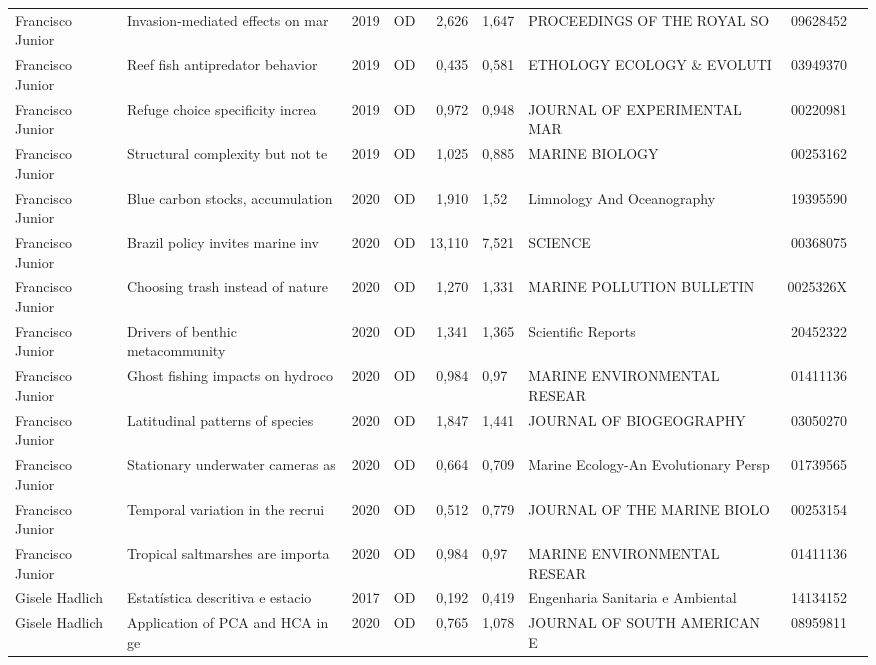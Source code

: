 \documentclass[12pt,brazil]{article}\usepackage[]{graphicx}\usepackage[]{xcolor}
\begin{document}
\begin{longtable}{lllrrllrr}
Francisco Junior & Invasion-mediated effects on mar & 2019 & OD & 2,626 & 1,647 & PROCEEDINGS OF THE ROYAL SO & 09628452 \\
Francisco Junior & Reef fish antipredator behavior  & 2019 & OD & 0,435 & 0,581 & ETHOLOGY ECOLOGY \& EVOLUTI & 03949370 \\
Francisco Junior & Refuge choice specificity increa & 2019 & OD & 0,972 & 0,948 & JOURNAL OF EXPERIMENTAL MAR & 00220981 \\
Francisco Junior & Structural complexity but not te & 2019 & OD & 1,025 & 0,885 & MARINE BIOLOGY & 00253162 \\
Francisco Junior & Blue carbon stocks, accumulation & 2020 & OD & 1,910 & 1,52 & Limnology And Oceanography & 19395590 \\
Francisco Junior & Brazil policy invites marine inv & 2020 & OD & 13,110 & 7,521 & SCIENCE & 00368075 \\
Francisco Junior & Choosing trash instead of nature & 2020 & OD & 1,270 & 1,331 & MARINE POLLUTION BULLETIN & 0025326X \\
Francisco Junior & Drivers of benthic metacommunity & 2020 & OD & 1,341 & 1,365 & Scientific Reports & 20452322 \\
Francisco Junior & Ghost fishing impacts on hydroco & 2020 & OD & 0,984 & 0,97 & MARINE ENVIRONMENTAL RESEAR & 01411136 \\
Francisco Junior & Latitudinal patterns of species  & 2020 & OD & 1,847 & 1,441 & JOURNAL OF BIOGEOGRAPHY & 03050270 \\
Francisco Junior & Stationary underwater cameras as & 2020 & OD & 0,664 & 0,709 & Marine Ecology-An Evolutionary Persp & 01739565 \\
Francisco Junior & Temporal variation in the recrui & 2020 & OD & 0,512 & 0,779 & JOURNAL OF THE MARINE BIOLO & 00253154 \\
Francisco Junior & Tropical saltmarshes are importa & 2020 & OD & 0,984 & 0,97 & MARINE ENVIRONMENTAL RESEAR & 01411136 \\
Gisele Hadlich & Estatística descritiva e estacio & 2017 & OD & 0,192 & 0,419 & Engenharia Sanitaria e Ambiental & 14134152 \\
\rowcolor{coautr}\rowcolor{coautr}\rowcolor{coautr}\rowcolor{coautr}\rowcolor{coautr}\rowcolor{coautr}\rowcolor{coautr}\rowcolor{coautr}\rowcolor{coautr}\rowcolor{coautr}\rowcolor{coautr}\rowcolor{coautr}\rowcolor{coautr}\rowcolor{coautr}\rowcolor{coautr}\rowcolor{coautr}Gisele Hadlich & Application of PCA and HCA in ge & 2020 & OD & 0,765 & 1,078 & JOURNAL OF SOUTH AMERICAN E & 08959811 \\

\end{longtable}
\end{document}
